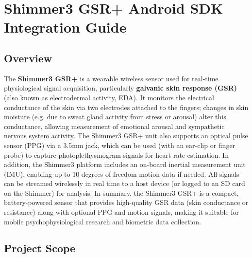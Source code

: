 \chapter{Shimmer3 GSR+ Android SDK Integration Guide}

\section{Overview}

The \textbf{Shimmer3 GSR+} is a wearable wireless sensor used for real-time
physiological signal acquisition, particularly \textbf{galvanic skin response
(GSR)} (also known as electrodermal activity,
EDA)\cite{ref1}.
It monitors the electrical conductance of the skin via two electrodes
attached to the fingers; changes in skin moisture (e.g. due to sweat
gland activity from stress or arousal) alter this conductance, allowing
measurement of emotional arousal and sympathetic nervous system
activity\cite{ref2}\cite{ref3}.
The Shimmer3 GSR+ unit also supports an optical pulse sensor (PPG) via a
3.5mm jack, which can be used (with an ear-clip or finger probe) to
capture photoplethysmogram signals for heart rate
estimation\cite{ref4}\cite{ref5}.
In addition, the Shimmer3 platform includes an on-board inertial
measurement unit (IMU), enabling up to 10 degrees-of-freedom motion data
if
needed\cite{ref6}.
All signals can be streamed wirelessly in real time to a host device (or
logged to an SD card on the Shimmer) for
analysis\cite{ref7}.
In summary, the Shimmer3 GSR+ is a compact, battery-powered sensor that
provides high-quality GSR data (skin conductance or resistance) along
with optional PPG and motion signals, making it suitable for mobile
psychophysiological research and biometric data collection.

\section{Project Scope}

